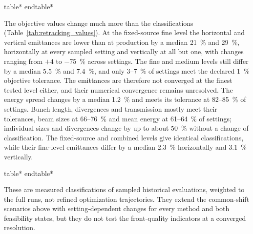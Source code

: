 \documentclass[aps,prab,reprint,superscriptaddress,amsmath,amssymb,floatfix]{revtex4-2}
\newcommand{\inputwide}[1]{\begingroup
  \expandafter\let\expandafter\table\csname table*\endcsname
  \expandafter\let\expandafter\endtable\csname endtable*\endcsname
  \endgroup}
\begin{document}
\inputwide{revisions/evidence/r6_resolution_table}

The objective values change much more than the classifications (Table~\ref{tab:retracking_values}).
At the fixed-source fine level the horizontal and vertical emittances are lower than at production
by a median \SI{21}{\percent} and \SI{29}{\percent}, horizontally at every sampled setting and
vertically at all but one, with changes ranging from $+4$ to \SI{-75}{\percent} across settings.
The fine and medium levels still differ by a median \SI{5.5}{\percent} and \SI{7.4}{\percent},
and only 3--\SI{7}{\percent} of settings meet the declared \SI{1}{\percent} objective tolerance.
The emittances are therefore not converged at the finest tested level either, and their numerical
convergence remains unresolved. The energy spread changes by a median \SI{1.2}{\percent} and meets
its tolerance at 82--\SI{85}{\percent} of settings. Bunch length, divergences and transmission
mostly meet their tolerances, beam sizes at 66--\SI{76}{\percent} and mean energy at
61--\SI{64}{\percent} of settings; individual sizes and divergences change by up to about
\SI{50}{\percent} without a change of classification. The fixed-source and combined levels give
identical classifications, while their fine-level emittances differ by a median \SI{2.3}{\percent}
horizontally and \SI{3.1}{\percent} vertically.

\inputwide{revisions/evidence/r6_numerical_table}

These are measured classifications of sampled historical evaluations, weighted to the full runs,
not refined optimization trajectories. They extend the common-shift scenarios above with
setting-dependent changes for every method and both feasibility states, but they do not test the
front-quality indicators at a converged resolution.
\end{document}
